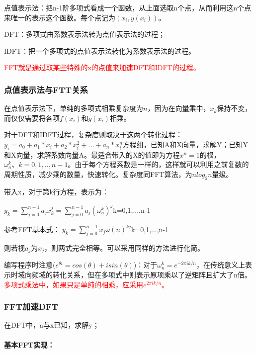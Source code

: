 \documentclass[UTF8]{article}%
\begin{document}
点值表示法：把n-1阶多项式看成一个函数，从上面选取n个点，从而利用这n个点来唯一的表示这个函数。每个点记为$(x_i,y(x_i))$。

DFT：多项式由系数表示法转为点值表示法的过程；

IDFT：把一个多项式的点值表示法转化为系数表示法的过程。

\textcolor{red}{FFT就是通过取某些特殊的x的点值来加速DFT和IDFT的过程。}

\subsubsection{点值表示法与FTT关系}

在点值表示法下，单纯的多项式相乘复杂度为$n$，因为在向量乘中，$x_k$保持不变，而仅仅需要将各项$f(x_i)$和$g(x_i)$相乘。

对于DFT和IDFT过程，复杂度则取决于这两个转化过程：$y_i=a_0+a_1*x_i+a_2*x_i^2+...+a_n*x_i^n$方程组，已知A和X向量，求解Y；已知Y和X向量，求解系数向量A。最适合带入的X的值即为方程$x^n=1$的根，$\omega_n^k、k=0,1,..,n-1$。由于每个方程系数是一样的，这样就可以利用之前复数的周期性质，减少乘的数量，快速转化。复杂度同FFT算法，为$nlog_2n$量级。

带入x，对于第k行方程，表示为：

$y_k=\sum_{j = 0}^{n-1} a_jx_k^j = \sum_{j = 0}^{n-1} a_j(\omega_n^k)^j$\qquad k=0,1,...,n-1

参考FFT基本式： $y_k=\sum_{j=0}^{n-1} x_j \omega (n)^{kj}$\qquad k=0,1,...,n-1

则若视$a_j$为$x_j$，则两式完全相等。可以采用同样的方法进行化简。


编写程序时注意($e^{\theta i}=cos(\theta)+isin(\theta)$)：对于$\omega_n^k=e^{-{2\pi i k}/n}$，在传统意义上表示时域向频域的转化关系，但在多项式中则表示原项乘以了逆矩阵且扩大了n倍。\textcolor{red}{多项式乘法中，如果只是单纯的相乘，应采用$e^{{2\pi i k}/n}$。}

\subsubsection{FFT加速DFT}

在DFT中，a与x已知，求解y；

\paragraph{基本FFT实现：}~{}
\end{document}
